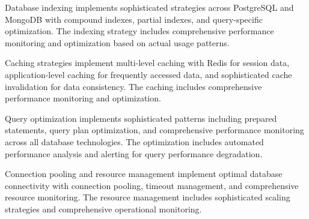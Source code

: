 Database indexing implements sophisticated strategies across PostgreSQL and MongoDB with compound indexes, partial indexes, and query-specific optimization. The indexing strategy includes comprehensive performance monitoring and optimization based on actual usage patterns.

Caching strategies implement multi-level caching with Redis for session data, application-level caching for frequently accessed data, and sophisticated cache invalidation for data consistency. The caching includes comprehensive performance monitoring and optimization.

Query optimization implements sophisticated patterns including prepared statements, query plan optimization, and comprehensive performance monitoring across all database technologies. The optimization includes automated performance analysis and alerting for query performance degradation.

Connection pooling and resource management implement optimal database connectivity with connection pooling, timeout management, and comprehensive resource monitoring. The resource management includes sophisticated scaling strategies and comprehensive operational monitoring.